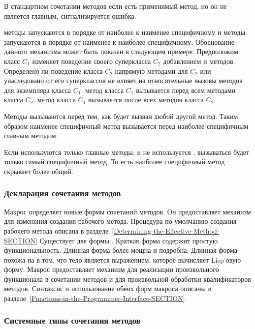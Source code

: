 В стандартном сочетании методов если есть применимый метод, но он не является
главным, сигнализируется ошибка.

 методы запускаются в порядке от наиболее к наименее специфичному и
 методы запускаются в порядке от наименее к наиболее
специфичному. Обоснование данного механизма может быть показан в следующем
примере.
Предположим класс $C_1$ изменяет поведение своего суперкласса $C_2$ добавлением
 и  методов.  Определено ли поведение класса $C_2$
напрямую методами для $C_2$ или унаследовано от его суперклассов не влияет на
относительные вызовы методов для экземпляра класса $C_1$.  метод
класса $C_1$ вызывается перед всем методами класса $C_2$.  метод
класса $C_1$ вызывается после всех методов класса $C_2$. 

Методы  вызываются перед тем, как будет вызван любой другой
метод. Таким образом наименее специфичный  метод вызывается перед
наиболее специфичным главным методом.

Если используются только главные методы, и не используется
, вызываться будет только самый специфичный метод. То есть
наиболее специфичный метод скрывает более общий.

\subsubsection{Декларация сочетания методов}

Макрос  определяет новые формы сочетаний
методов. Он предоставляет механизм для изменения создания рабочего
метода. Процедура по-умолчанию создания рабочего метода описана в
разделе~\ref{Determining-the-Effective-Method-SECTION} 
Существует две формы . Краткая форма содержит
простую функциональность. Длинная форма более мощна и подробна. Длинная форма
похожа на  в том, что тело является выражением. которое вычисляет
Lisp'овую форму. Макрос предоставляет механизм для реализации произвольного 
функционала в сочетании методов и для произвольной обработки квалификаторов
методов. Синтаксис и использование обеих форм макроса
 описаны в
разделе~\ref{Functions-in-the-Programmer-Interface-SECTION}.

\subsubsection{Системные типы сочетания методов}
\label{Built-in-Method-Combination-Types-SECTION}

